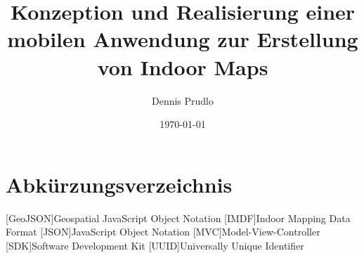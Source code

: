 \documentclass[a4paper, 12pt, twoside]{report}
\title{Konzeption und Realisierung einer mobilen Anwendung zur Erstellung von Indoor Maps}
\author{Dennis Prudlo}
\date{\today}
\newcounter{currentpage}
\begin{document}
	

	\pagestyle{plain}

	
	

	\tableofcontents
	\clearpage

	\listoffigures
	\clearpage

	\chapter*{Abkürzungsverzeichnis}
	\begin{acronym}
		[GeoJSON]{Geospatial JavaScript Object Notation}
		{Indoor Mapping Data Format}
		{JavaScript Object Notation}
		[MVC]{Model-View-Controller}
		[SDK]{Software Development Kit}
		{Universally Unique Identifier}
	\end{acronym}
	\clearpage


	\pagestyle{fancy}
	\setcounter{page}{\thecurrentpage}

	
	
	
	\clearpage

	
\end{document}
